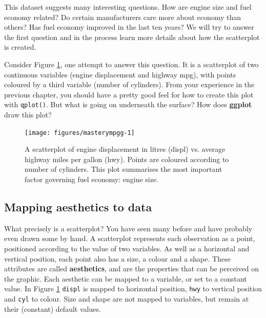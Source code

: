 This dataset suggests many interesting questions. How are engine size
and fuel economy related? Do certain manufacturers care more about
economy than others? Has fuel economy improved in the last ten years? We
will try to answer the first question and in the process learn more
details about how the scatterplot is created.


Consider Figure \ref{fig:mpgg}, one attempt to answer this question. It
is a scatterplot of two continuous variables (engine displacement and
highway mpg), with points coloured by a third variable (number of
cylinders). From your experience in the previous chapter, you should
have a pretty good feel for how to create this plot with
\texttt{qplot()}. But what is going on underneath the surface? How does
\textbf{ggplot} draw this plot? 

\begin{Shaded}
\begin{Highlighting}[]
  
\end{Highlighting}
\end{Shaded}

\begin{figure}

{\centering \texttt{[image: figures/masterympgg-1]} 

}

\caption{A scatterplot of engine displacement in litres (displ) vs. average highway miles per gallon (hwy).  Points are coloured according to number of cylinders.  This plot summarises the most important factor governing fuel economy: engine size.\label{fig:mpgg}}
\end{figure}

\subsection{Mapping aesthetics to data}

What precisely is a scatterplot? You have seen many before and have
probably even drawn some by hand. A scatterplot represents each
observation as a point, positioned according to the value of two
variables. As well as a horizontal and vertical position, each point
also has a size, a colour and a shape. These attributes are called
\textbf{aesthetics}, and are the properties that can be perceived on the
graphic. Each aesthetic can be mapped to a variable, or set to a
constant value. In Figure \ref{fig:mpgg} \texttt{displ} is mapped to
horizontal position, \texttt{hwy} to vertical position and \texttt{cyl}
to colour. Size and shape are not mapped to variables, but remain at
their (constant) default values. 

